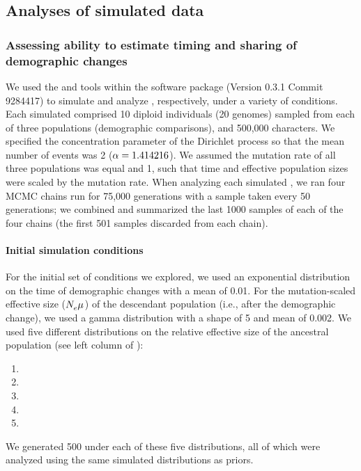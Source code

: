 

\subsection{Analyses of simulated data}

\subsubsection{Assessing ability to estimate timing and sharing of demographic changes}

We used the \simcoevolity and \eceovlity tools within the \ecoevolity software
package (Version 0.3.1 Commit 9284417) to simulate and analyze \datasets,
respectively, under a variety of conditions.
Each simulated \datasest comprised 10 diploid individuals (20 genomes) sampled
from each of three populations (demographic comparisons), and 500,000
characters.
We specified the concentration parameter of the Dirichlet process so that
the mean number of events was 2 ($\alpha = 1.414216$).
We assumed the mutation rate of all three populations was equal and 1, such
that time and effective population sizes were scaled by the mutation rate.
When analyzing each simulated \dataset, we ran four MCMC chains run for 75,000
generations with a sample taken every 50 generations; we combined and
summarized the last 1000 samples of each of the four chains (the first 501
samples discarded from each chain).

\paragraph{Initial simulation conditions}

For the initial set of conditions we explored, we used an exponential
distribution on the time of demographic changes with a mean of 0.01.
For the mutation-scaled effective size ($N_{e}^{}\mu_{}$) of the descendant
population (i.e., after the demographic change), we used a gamma distribution
with a shape of 5 and mean of 0.002.
We used five different distributions on the relative effective
size of the ancestral population (see left column of
\figs
{}):
\begin{enumerate}[label=A.\arabic*]
    \item {} 
    \item {} 
    \item {} 
    \item {} 
    \item {} 
\end{enumerate}
We generated 500 \datasets under each of these five distributions, all of which
were analyzed using the same simulated distributions as priors.

